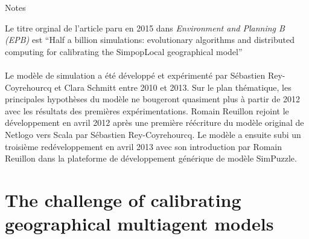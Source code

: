 \begin{framewithtitle}{Notes}

Le titre orginal de l'article paru en 2015 dans \textit{Environment and Planning B (EPB)} est \foreignquote{english}{Half a billion simulations: evolutionary algorithms and distributed computing for calibrating the SimpopLocal geographical model}
\\ \\
Le modèle de simulation a été développé et expérimenté par Sébastien Rey-Coyrehourcq et Clara Schmitt entre 2010 et 2013. Sur le plan thématique, les principales hypothèses du modèle ne bougeront quasiment plus à partir de 2012 avec les résultats des premières expérimentations. Romain Reuillon rejoint le développement en avril 2012 après une première réécriture du modèle original de Netlogo vers Scala par Sébastien Rey-Coyrehourcq. Le modèle a ensuite subi un troisième redéveloppement en avril 2013 avec son introduction par Romain Reuillon dans la plateforme de développement générique de modèle SimPuzzle.

\end{framewithtitle}






\section{The challenge of calibrating geographical multiagent models}
\label{sec:challenge}

